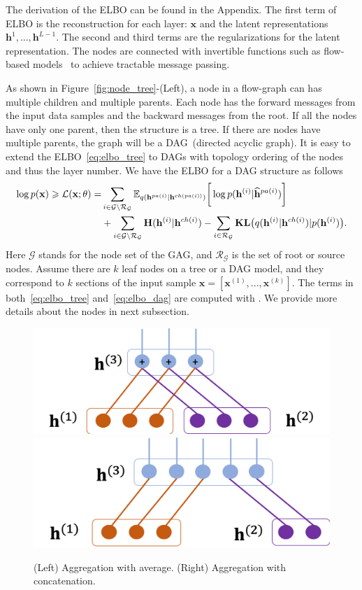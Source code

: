 \documentclass{article} %
\begin{document}
The derivation of the ELBO can be found in the Appendix. The first term of ELBO is the reconstruction for each layer: $\mathbf{x}$ and the latent representations $\mathbf{h}^1, ..., \mathbf{h}^{L-1}$. The second and third terms are the regularizations for the latent representation. The nodes are connected with invertible functions such as flow-based models~\cite{Dinh2016DensityEU} to achieve tractable message passing. 

As shown in Figure~\ref{fig:node_tree}-(Left), a node in a flow-graph can has multiple children and multiple parents. Each node has the forward messages from the input data samples and the backward messages from the root.  If all the nodes have only one parent, then the structure is a tree. If there are nodes have multiple parents, the graph will be a DAG~(directed acyclic graph). It is easy to extend the ELBO~\eqref{eq:elbo_tree} to DAGs with topology ordering  of the nodes and thus the layer number. We have the ELBO for a DAG structure as follows
\begin{align}  \notag
 \log p(\mathbf{x}) \geqslant \mathcal{L}(\mathbf{x}; \theta) 
= &  \sum_{i \in \mathcal{G}  \setminus  \mathcal{R}_{ \mathcal{G} }  }  \mathbb{E}_{q(\mathbf{h}^{pa(i)}|\mathbf{h}^{ch(pa(i))})} \bigg[ \log p( \mathbf{h}^{(i)}|  \widehat{\mathbf{h}}^{pa(i)})   \bigg]\\
 & +  \sum_{i \in \mathcal{G}  \setminus  \mathcal{R}_{ \mathcal{G} }  } \textbf{\text{H}}(\mathbf{h}^{(i)} | \mathbf{h}^{ch(i)} )   -    \sum_{i \in  \mathcal{R}_{ \mathcal{G} }  }  \textbf{\text{KL}}\big(q(\mathbf{h}^{(i)} | \mathbf{h}^{ch(i)} )   | p(\mathbf{h}^{(i)})  \big) . \label{eq:elbo_dag}
 \end{align}
Here $\mathcal{G}$ stands for the node set of the GAG, and $\mathcal{R}_{ \mathcal{G}}$ is the set of root or source nodes. 
 Assume there are $k$ leaf nodes on a tree or a DAG model, and they correspond to $k$ sections of the input sample $\mathbf{x} = [\mathbf{x}^{(1)}, ..., \mathbf{x}^{(k)}]$.   The terms in both~\eqref{eq:elbo_tree} and~\eqref{eq:elbo_dag} are computed with . We provide more details about the nodes in next subsection.
 
\begin{figure}[!htbp] %
\begin{center}
 \includegraphics[width=0.43\linewidth]{fig/node_aggre_sum.png}
 \includegraphics[width=0.43\linewidth]{fig/node_aggre_cat.png}
\end{center}
   \caption{(Left) Aggregation with average. (Right) Aggregation with concatenation. }
\label{fig:node_aggre}
\end{figure}
\end{document}
